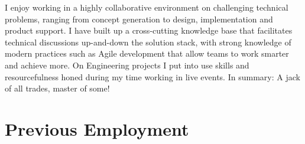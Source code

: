 \documentclass[]{deedy-resume-openfont-wjl}
\begin{document}
%
%


%
%

I enjoy working in a highly collaborative environment on challenging technical problems, ranging from concept generation to design, implementation and product support.
I have built up a cross-cutting knowledge base that facilitates technical discussions up-and-down the solution stack, with strong knowledge of modern practices such as Agile development that allow teams to work smarter and achieve more.
On Engineering projects I put into use skills and resourcefulness honed during my time working in live events.
In summary: A jack of all trades, master of some!

%
%
\sectionsep
\section{Previous Employment}












\end{document}

